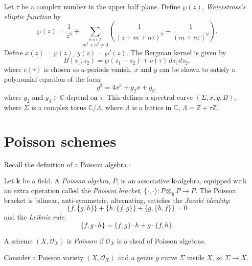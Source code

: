     \begin{ex}
    Let \( \tau \) be a complex number in the upper half plane. Define \(\wp(z)\), \emph{Weierstrass's elliptic function} \cite{whitwhat} by 
    \[ \wp(z) = \frac{1}{z^2} + \sum_{\overset{m,n \in \mathbb{Z}
    }{ m^2 + n^2 \neq 0}} \left( \frac{1}{(z+m+n \tau)^2} -\frac{1}{(m+n \tau)^2}    \right).\] 
    Define \( x(z) = \wp(z) \), \(y(z) = \wp'(z)\). The Bergman kernel is given by
    \[  B(z_1,z_2) = \wp(z_1-z_2) + c(\tau) \,dz_1 dz_2,\]
    where \( c(\tau)\) is chosen so \(a\)-periods vanish.
    \( x\) and \(y\) can be shown to satisfy a polynomial equation of the form 
    \[ y^2 = 4 x^3 + g_2 x + g_3,\]
    where \(g_2\) and \(g_3 \in \mathbb{C}\) depend on \( \tau\).
    This defines a spectral curve \( (\Sigma, x,y,B)\), where \(\Sigma\) is a complex torus \( \mathbb{C}/\Lambda\), where \( \Lambda\) is a lattice in \( \mathbb{C}\), \( \Lambda = \mathbb{Z} + \tau \mathbb{Z} \).
    \end{ex}
    

    \section{Poisson schemes}
    Recall the definition of a Poisson algebra  \cite{jordan}:

    \begin{defn}
            Let \( \mathbf{k} \) be a field. A \emph{Poisson algebra}, \(P\), is an associative \( \mathbf{k} \)-algebra, equipped with an extra operation called the \emph{Poisson bracket}, \( \{ \cdot  , \cdot  \} : P \otimes_{\mathbf{k}} P \rightarrow P\). The Poisson bracket is bilinear,
            anti-symmetric, alternating, satisfies the \emph{Jacobi identity}:
            \[ \{ f, \{g,h\} \} +\{ h, \{f,g\}\} + \{ g ,\{h,f\}\} = 0\] 
            and the \emph{Leibniz rule}:
            \[ \{ f, g \cdot h \} = \{f,g\}\cdot h + g \cdot \{ f , h\}.\]
    \end{defn}
    
    \begin{defn}
        A scheme \((X, \mathcal{O}_X)\) is \emph{Poisson} if \( \mathcal{O}_X\) is a sheaf of Poisson algebras.
    \end{defn}
    
    Consider a Poisson variety \( (X,\mathcal{O}_X)\) and a genus \(g\) curve \(\Sigma\) inside \( X\), so \( \Sigma \rightarrow X\). 
    
